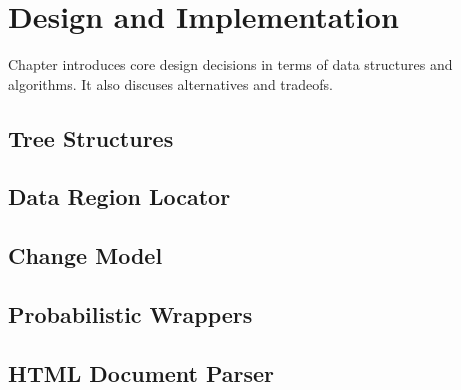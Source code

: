\chapter{Design and Implementation}

Chapter introduces core design decisions in terms of data structures and algorithms. It also discuses alternatives and tradeofs.

\section{Tree Structures}
\section{Data Region Locator}
\section{Change Model}
\section{Probabilistic Wrappers}
\section{HTML Document Parser}

